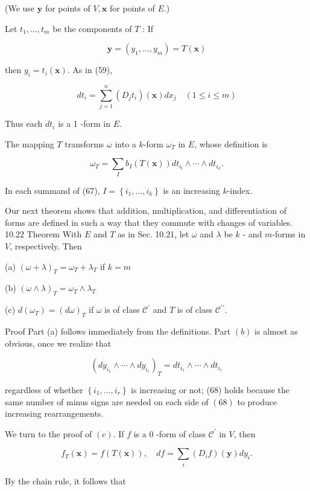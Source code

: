 \documentclass[10pt]{article}
\begin{document}
(We use $\mathbf{y}$ for points of $V, \mathbf{x}$ for points of $E$.)

Let $t_{1}, \ldots, t_{m}$ be the components of $T$ : If

$$
\mathbf{y}=\left(y_{1}, \ldots, y_{m}\right)=T(\mathbf{x})
$$

then $y_{i}=t_{i}(\mathbf{x})$. As in (59),

$$
d t_{i}=\sum_{j=1}^{n}\left(D_{j} t_{i}\right)(\mathbf{x}) d x_{j} \quad(1 \leq i \leq m)
$$

Thus each $d t_{i}$ is a 1 -form in $E$.

The mapping $T$ transforms $\omega$ into a $k$-form $\omega_{T}$ in $E$, whose definition is

$$
\omega_{T}=\sum_{I} b_{I}(T(\mathbf{x})) d t_{i_{l}} \wedge \cdots \wedge d t_{i_{k}} .
$$

In each summand of (67), $I=\left\{i_{1}, \ldots, i_{k}\right\}$ is an increasing $k$-index.

Our next theorem shows that addition, multiplication, and differentiation of forms are defined in such a way that they commute with changes of variables. 10.22 Theorem With $E$ and $T$ as in Sec. 10.21, let $\omega$ and $\lambda$ be $k$ - and $m$-forms in $V$, respectively. Then

(a) $(\omega+\lambda)_{T}=\omega_{T}+\lambda_{T}$ if $k=m$

(b) $(\omega \wedge \lambda)_{T}=\omega_{T} \wedge \lambda_{T}$

(c) $d\left(\omega_{T}\right)=(d \omega)_{T}$ if $\omega$ is of class $\mathscr{C}^{\prime}$ and $T$ is of class $\mathscr{C}^{\prime \prime}$.

Proof Part (a) follows immediately from the definitions. Part $(b)$ is almost as obvious, once we realize that

$$
\left(d y_{i_{1}} \wedge \cdots \wedge d y_{i_{r}}\right)_{T}=d t_{i_{1}} \wedge \cdots \wedge d t_{i_{r}}
$$

regardless of whether $\left\{i_{1}, \ldots, i_{r}\right\}$ is increasing or not; (68) holds because the same number of minus signs are needed on each side of $(68)$ to produce increasing rearrangements.

We turn to the proof of $(c)$. If $f$ is a 0 -form of class $\mathscr{C}^{\prime}$ in $V$, then

$$
f_{T}(\mathbf{x})=f(T(\mathbf{x})), \quad d f=\sum_{i}\left(D_{i} f\right)(\mathbf{y}) d y_{i} .
$$

By the chain rule, it follows that
\end{document}
